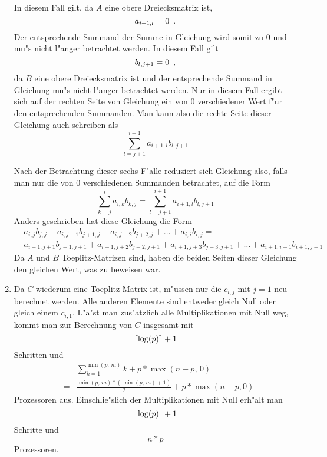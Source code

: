 \begin{beweis}
\begin{enumerate}
\begin{MyDescription}
                    In diesem Fall gilt, da $A$ eine obere Dreiecksmatrix
                    ist, \[ a_{i+1,l} = 0 \mbox{\hspace{0.5em}.} \]
                    Der entsprechende Summand der
                    Summe in Gleichung  wird somit zu
                    $0$ und mu"s nicht l"anger betrachtet werden.
                    In diesem Fall gilt \[ b_{l,j+1} = 0 \mbox{\hspace{0.5em},} \]
                    da $B$ eine
                    obere Dreiecksmatrix ist und der entsprechende Summand
                    in Gleichung  mu"s nicht l"anger
                    betrachtet werden.
                    Nur in diesem Fall ergibt sich auf der rechten Seite
                    von Gleichung  ein von $0$
                    verschiedener Wert f"ur den entsprechenden Summanden.
                    Man kann also die rechte Seite dieser Gleichung auch
                    schreiben als
                    \[ \sum_{l=j+1}^{i+1} a_{i+1,l} b_{l,j+1} \]
            \end{MyDescription}
            Nach der Betrachtung dieser sechs F"alle reduziert sich
            Gleichung  also, falls man nur die von
            $0$ verschiedenen Summanden betrachtet, auf die Form
            \[ \sum_{k=j}^i a_{i,k} b_{k,j} =
               \sum_{l=j+1}^{i+1} a_{i+1,l} b_{l,j+1}
            \]
            Anders geschrieben hat diese Gleichung die Form
            \begin{eqnarray*}
            &   a_{i,j} b_{j,j} + a_{i,j+1} b_{j+1,j} + a_{i,j+2} b_{j+2,j}
                + \ldots + a_{i,i} b_{i,j} =
            & \\
            &   a_{i+1,j+1} b_{j+1,j+1} + a_{i+1,j+2} b_{j+2,j+1} +
                a_{i+1,j+3} b_{j+3,j+1} + \ldots + a_{i+1,i+1} b_{i+1,j+1}
            &
            \end{eqnarray*}
            Da $A$ und $B$ Toeplitz-Matrizen sind, haben die beiden
            Seiten dieser Gleichung den gleichen Wert, was zu beweisen war.
        \item
            Da $C$ wiederum eine Toeplitz-Matrix ist,
            m"ussen nur die $c_{i,j}$ mit $j=1$ neu berechnet
            werden. Alle anderen Elemente sind entweder gleich Null oder
            gleich einem $c_{i,1}$. L"a"st man zus"atzlich alle
            Multiplikationen mit Null weg, kommt man
            zur Berechnung von $C$ insgesamt mit
            \[ \left\lceil \log(p) \right\rceil + 1 \] Schritten und
            \begin{eqnarray*}
                & & \sum_{k=1}^{\min(p,\,m)} k + p * \max(n-p,\,0) \\
                & = & \frac{ \min(p,\,m)* (\min(p,\,m) +1) }{2}
                      + p * \max(n-p,0)
            \end{eqnarray*} Prozessoren aus. Einschlie"slich der 
            Multiplikationen mit Null erh"alt man
            \[ \left\lceil \log(p) \right\rceil + 1 \] Schritte und
            \[ n * p \] Prozessoren.
    \end{enumerate}
\end{beweis}

